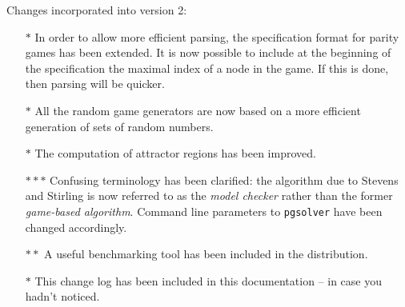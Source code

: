 Changes incorporated into version 2:
\begin{itemize}
\item[$\ast$] In order to allow more efficient parsing, the specification format for parity
      games has been extended. It is now possible to include at the beginning of the specification
      the maximal index of a node in the game. If this is done, then parsing will be quicker.
\item[$\ast$] All the random game generators are now based on a more efficient generation
      of sets of random numbers.
\item[$\ast$] The computation of attractor regions has been improved.
\item[$\ast\ast\ast$] Confusing terminology has been clarified: the algorithm due to Stevens and
     Stirling \cite{StevensStirling98} is now referred to as the \emph{model checker} rather than the 
     former \emph{game-based algorithm}. Command line parameters to \texttt{pgsolver} have been 
     changed accordingly.
\item[$\ast\ast$] A useful benchmarking tool has been included in the distribution.
\item[$\ast$] This change log has been included in this documentation -- in case you hadn't noticed.
\end{itemize} 

 

